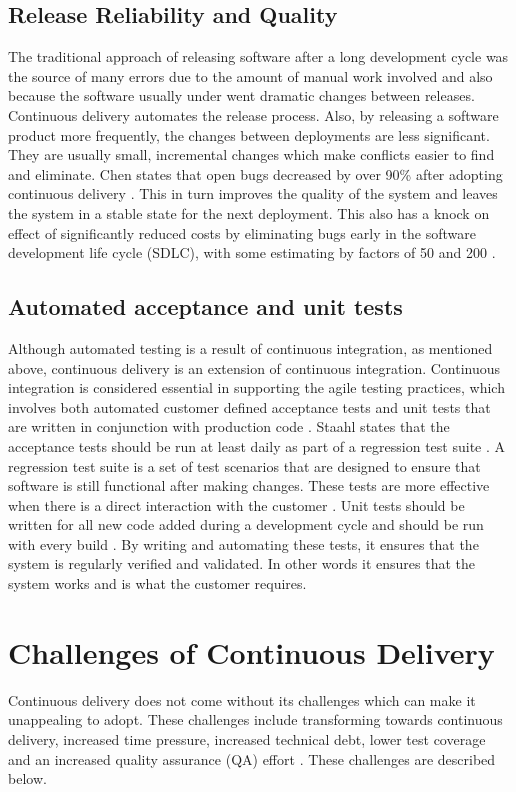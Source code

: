 \documentclass[10pt,journal,compsoc]{IEEEtran}
\begin{document}
\subsection{Release Reliability and Quality}
The traditional approach of releasing software after a long development cycle was the source of many errors due to the amount of manual work involved and also because the software usually under went dramatic changes between releases. Continuous delivery automates the release process. Also, by releasing a software product more frequently, the changes between deployments are less significant. They are usually small, incremental changes which make conflicts easier to find and eliminate. Chen states that open bugs decreased by over 90\% after adopting continuous delivery \cite{chen2015continuous}. This in turn improves the quality of the system and leaves the system in a stable state for the next deployment. This also has a knock on effect of significantly reduced costs by eliminating bugs early in the software development life cycle (SDLC), with some estimating by factors of 50 and 200 \cite{boehm1988understanding}.

\subsection{Automated acceptance and unit tests}
Although automated testing is a result of continuous integration, as mentioned above, continuous delivery is an extension of continuous integration. Continuous integration is considered essential in supporting the agile testing practices, which involves both automated customer defined acceptance tests and unit tests that are written in conjunction with production code \cite{staahl2013experienced}. Staahl states that the acceptance tests should be run at least daily as part of a regression test suite \cite{staahl2013experienced}. A regression test suite is a set of test scenarios that are designed to ensure that software is still functional after making changes. These tests are more effective when there is a direct interaction with the customer \cite{staahl2013experienced}. Unit tests should be written for all new code added during a development cycle and should be run with every build \cite{staahl2013experienced}. By writing and automating these tests, it ensures that the system is regularly verified and validated. In other words it ensures that the system works and is what the customer requires.

\section{Challenges of Continuous Delivery}
Continuous delivery does not come without its challenges which can make it unappealing to adopt. These challenges include transforming towards continuous delivery, increased time pressure, increased technical debt, lower test coverage and an increased quality assurance (QA) effort \cite{LAUKKANEN201755}. These challenges are described below.
\end{document}

